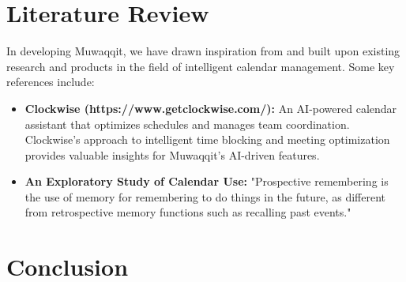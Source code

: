 \documentclass[12pt,a4paper]{article}
\begin{document}
\section{Literature Review}

In developing Muwaqqit, we have drawn inspiration from and built upon existing research and products in the field of intelligent calendar management. Some key references include:

\begin{itemize}
    \item \textbf{Clockwise (https://www.getclockwise.com/):} An AI-powered calendar assistant that optimizes schedules and manages team coordination. Clockwise's approach to intelligent time blocking and meeting optimization provides valuable insights for Muwaqqit's AI-driven features.
    \item \textbf{An Exploratory Study of Calendar Use:} "Prospective remembering is the use of memory for remembering to do things in the future, as different from retrospective memory functions such as recalling past events."
\end{itemize}

\section{Conclusion}
\end{document}
